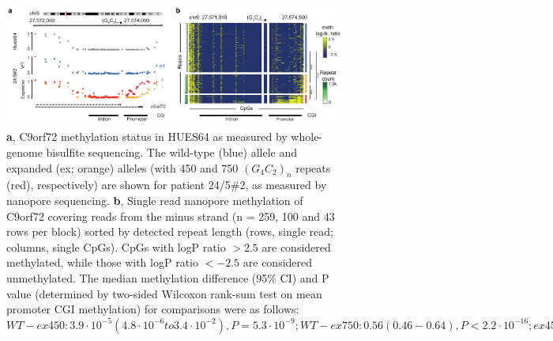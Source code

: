 \begin{figure}[h]
    \centering
    \includegraphics[width=1.0\textwidth]{figures/strique/methylation_c9orf72_region.pdf}
    \captionsetup{format=plain}
    \caption[Methylation state analyses at the single-read level]{\textbf{a}, C9orf72 methylation status in HUES64 as measured by whole-genome bisulfite sequencing. The wild-type (blue) allele and expanded (ex; orange) alleles (with 450 and 750 $ (G_{4}C_{2})_{n} $ repeats (red), respectively) are shown for patient 24/5\#2, as measured by nanopore sequencing. \textbf{b}, Single read nanopore methylation of C9orf72 covering reads from the minus strand (n = 259, 100 and 43 rows per block) sorted by detected repeat length (rows, single read; columns, single CpGs). CpGs with logP ratio $> 2.5$ are considered methylated, while those with logP ratio $< -2.5$ are considered unmethylated. The median methylation difference (95\% CI) and P value (determined by two-sided Wilcoxon rank-sum test on mean promoter CGI methylation) for comparisons were as follows: $ WT-ex450: 3.9 \cdot 10^{-5} (4.8 \cdot 10^{-6} to 3.4 \cdot 10^{-2}), P = 5.3 \cdot 10^{-9}; WT-ex750: 0.56 (0.46-0.64), P < 2.2 \cdot 10^{-16}; ex450-ex750: 0.53 (0.40-0.64), P < 2.2 \cdot 10^{-16}; ***P < 0.001. $ }
    \label{fig:strique:methylation_c9orf72_region}
\end{figure}

